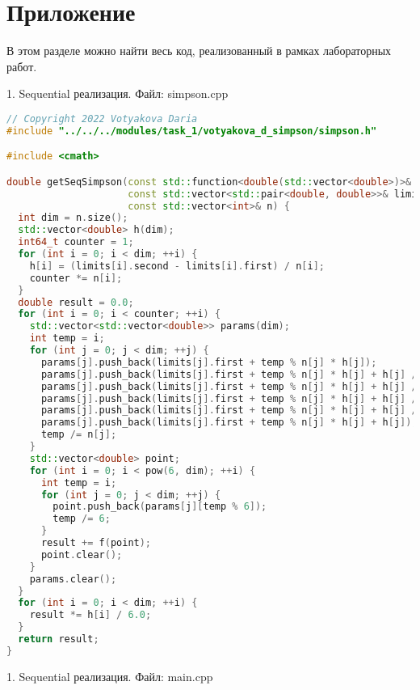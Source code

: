 \documentclass{report}
\begin{document}
\section*{Приложение}
В этом разделе можно найти весь код, реализованный в рамках лабораторных работ.
\par 1. Sequential реализация. Файл: simpson.cpp
\begin{lstlisting}[language=C++]
// Copyright 2022 Votyakova Daria
#include "../../../modules/task_1/votyakova_d_simpson/simpson.h"

#include <cmath>

double getSeqSimpson(const std::function<double(std::vector<double>)>& f,
                     const std::vector<std::pair<double, double>>& limits,
                     const std::vector<int>& n) {
  int dim = n.size();
  std::vector<double> h(dim);
  int64_t counter = 1;
  for (int i = 0; i < dim; ++i) {
    h[i] = (limits[i].second - limits[i].first) / n[i];
    counter *= n[i];
  }
  double result = 0.0;
  for (int i = 0; i < counter; ++i) {
    std::vector<std::vector<double>> params(dim);
    int temp = i;
    for (int j = 0; j < dim; ++j) {
      params[j].push_back(limits[j].first + temp % n[j] * h[j]);
      params[j].push_back(limits[j].first + temp % n[j] * h[j] + h[j] / 2);
      params[j].push_back(limits[j].first + temp % n[j] * h[j] + h[j] / 2);
      params[j].push_back(limits[j].first + temp % n[j] * h[j] + h[j] / 2);
      params[j].push_back(limits[j].first + temp % n[j] * h[j] + h[j] / 2);
      params[j].push_back(limits[j].first + temp % n[j] * h[j] + h[j]);
      temp /= n[j];
    }
    std::vector<double> point;
    for (int i = 0; i < pow(6, dim); ++i) {
      int temp = i;
      for (int j = 0; j < dim; ++j) {
        point.push_back(params[j][temp % 6]);
        temp /= 6;
      }
      result += f(point);
      point.clear();
    }
    params.clear();
  }
  for (int i = 0; i < dim; ++i) {
    result *= h[i] / 6.0;
  }
  return result;
}
\end{lstlisting}

\par 1. Sequential реализация. Файл: main.cpp
\end{document}
